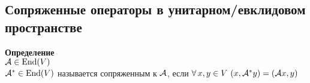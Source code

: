 \documentclass[12pt]{article}
\begin{document}
\subsection{Сопряженные операторы в унитарном/евклидовом пространстве}
\textbf{Определение}\\
$\mathcal{A} \in \operatorname{End}(V)$\\
$\mathcal{A}^* \in \operatorname{End}(V)$ называется сопряженным к $\mathcal{A}$, если $\forall\, x, y \in V\ (x, \mathcal{A}^* y) = (\mathcal{A} x,y)$\\
\end{document}

